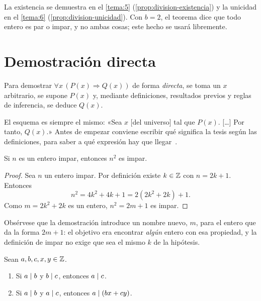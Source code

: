 La existencia se demuestra en el \cref{tema:5} (\cref{prop:division-existencia}) y la unicidad en el \cref{tema:6} (\cref{prop:division-unicidad}). Con $b=2$, el teorema dice que todo entero es par o impar, y no ambas cosas; este hecho se usará libremente.

\section{Demostración directa}

\begin{definicion}\label{def:directa}
Para demostrar $\forall x\,(P(x)\Rightarrow Q(x))$ de forma \emph{directa}, se toma un $x$ arbitrario, se supone $P(x)$ y, mediante definiciones, resultados previos y reglas de inferencia, se deduce $Q(x)$.
\end{definicion}

El esquema es siempre el mismo: «Sea $x$ [del universo] tal que $P(x)$. [\dots] Por tanto, $Q(x)$.» Antes de empezar conviene escribir qué significa la tesis según las definiciones, para saber a qué expresión hay que llegar~\cite[§4.3]{hammack}.

\begin{proposicion}\label{prop:impar-cuadrado}
Si $n$ es un entero impar, entonces $n^{2}$ es impar.
\end{proposicion}

\begin{proof}
Sea $n$ un entero impar. Por definición existe $k\in\mathbb{Z}$ con $n=2k+1$. Entonces
\[
n^{2}=4k^{2}+4k+1=2(2k^{2}+2k)+1.
\]
Como $m=2k^{2}+2k$ es un entero, $n^{2}=2m+1$ es impar.
\end{proof}

Obsérvese que la demostración introduce un nombre nuevo, $m$, para el entero que da la forma $2m+1$: el objetivo era encontrar \emph{algún} entero con esa propiedad, y la definición de impar no exige que sea el mismo $k$ de la hipótesis.

\begin{proposicion}\label{prop:divisibilidad}
Sean $a,b,c,x,y\in\mathbb{Z}$.
\begin{enumerate}
  \item Si $a\mid b$ y $b\mid c$, entonces $a\mid c$.
  \item Si $a\mid b$ y $a\mid c$, entonces $a\mid(bx+cy)$.
\end{enumerate}
\end{proposicion}

